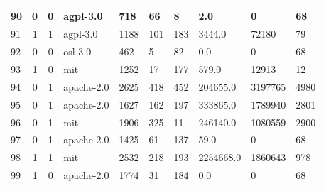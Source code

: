 \begin{landscape}
\begin{table}[]
{\begin{tabular}{lcclllllll}
                90  & 0                          & 0                     & agpl-3.0         & 718              & 66                    & 8                            & 2.0             & 0                  & 68                  \\ \hline
                91  & 1                          & 1                     & agpl-3.0         & 1188             & 101                   & 183                          & 3444.0          & 72180              & 79                  \\ \hline
                92  & 0                          & 0                     & osl-3.0          & 462              & 5                     & 82                           & 0.0             & 0                  & 68                  \\ \hline
                93  & 1                          & 0                     & mit              & 1252             & 17                    & 177                          & 579.0           & 12913              & 12                  \\ \hline
                94  & 0                          & 1                     & apache-2.0       & 2625             & 418                   & 452                          & 204655.0        & 3197765            & 4980                \\ \hline
                95  & 0                          & 1                     & apache-2.0       & 1627             & 162                   & 197                          & 333865.0        & 1789940            & 2801                \\ \hline
                96  & 0                          & 1                     & mit              & 1906             & 325                   & 11                           & 246140.0        & 1080559            & 2900                \\ \hline
                97  & 0                          & 1                     & apache-2.0       & 1425             & 61                    & 137                          & 59.0            & 0                  & 68                  \\ \hline
                98  & 1                          & 1                     & mit              & 2532             & 218                   & 193                          & 2254668.0       & 1860643            & 978                 \\ \hline
                99  & 1                          & 0                     & apache-2.0       & 1774             & 31                    & 184                          & 0.0             & 0                  & 68                  \\ \hline

\end{tabular}}
\end{table}
\end{landscape}
